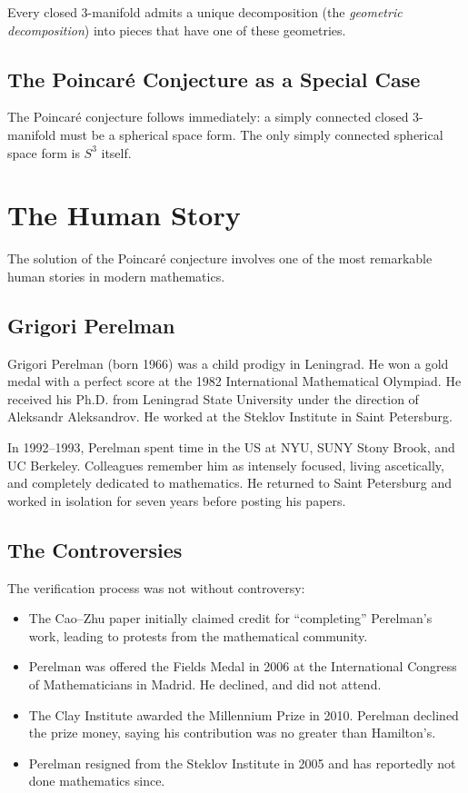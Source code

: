 Every closed 3-manifold admits a unique decomposition (the \textit{geometric decomposition}) into pieces that have one of these geometries.

\subsection{The Poincar\'{e} Conjecture as a Special Case}

The Poincar\'{e} conjecture follows immediately: a simply connected closed 3-manifold must be a spherical space form. The only simply connected spherical space form is $S^3$ itself.

\section{The Human Story}

The solution of the Poincar\'{e} conjecture involves one of the most remarkable human stories in modern mathematics.

\subsection{Grigori Perelman}

Grigori Perelman (born 1966) was a child prodigy in Leningrad. He won a gold medal with a perfect score at the 1982 International Mathematical Olympiad. He received his Ph.D. from Leningrad State University under the direction of Aleksandr Aleksandrov. He worked at the Steklov Institute in Saint Petersburg.

In 1992--1993, Perelman spent time in the US at NYU, SUNY Stony Brook, and UC Berkeley. Colleagues remember him as intensely focused, living ascetically, and completely dedicated to mathematics. He returned to Saint Petersburg and worked in isolation for seven years before posting his papers.

\subsection{The Controversies}

The verification process was not without controversy:
\begin{itemize}
  \item The Cao--Zhu paper initially claimed credit for ``completing'' Perelman's work, leading to protests from the mathematical community.
  \item Perelman was offered the Fields Medal in 2006 at the International Congress of Mathematicians in Madrid. He declined, and did not attend.
  \item The Clay Institute awarded the Millennium Prize in 2010. Perelman declined the prize money, saying his contribution was no greater than Hamilton's.
  \item Perelman resigned from the Steklov Institute in 2005 and has reportedly not done mathematics since.
\end{itemize}

